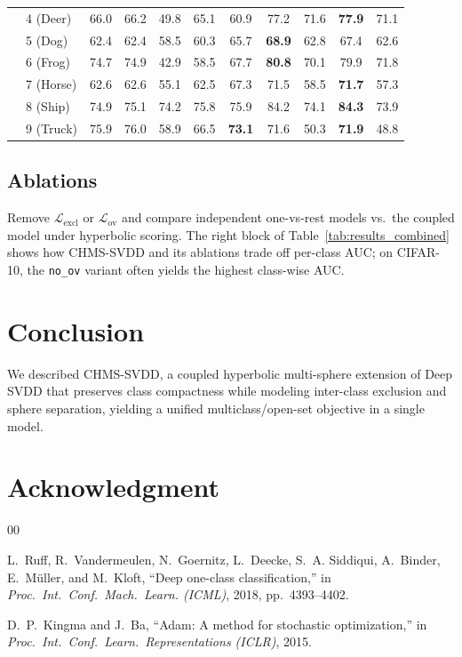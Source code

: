\documentclass[conference]{IEEEtran}
\begin{document}
\begin{table}[t]
{\begin{tabular}{@{}llccccc|cccc@{}}
& 4 (Deer) & 66.0 & 66.2 & 49.8 & 65.1 & 60.9 & 77.2 & 71.6 & \textbf{77.9} & 71.1 \\
& 5 (Dog) & 62.4 & 62.4 & 58.5 & 60.3 & 65.7 & \textbf{68.9} & 62.8 & 67.4 & 62.6 \\
& 6 (Frog) & 74.7 & 74.9 & 42.9 & 58.5 & 67.7 & \textbf{80.8} & 70.1 & 79.9 & 71.8 \\
& 7 (Horse) & 62.6 & 62.6 & 55.1 & 62.5 & 67.3 & 71.5 & 58.5 & \textbf{71.7} & 57.3 \\
& 8 (Ship) & 74.9 & 75.1 & 74.2 & 75.8 & 75.9 & 84.2 & 74.1 & \textbf{84.3} & 73.9 \\
& 9 (Truck) & 75.9 & 76.0 & 58.9 & 66.5 & \textbf{73.1} & 71.6 & 50.3 & \textbf{71.9} & 48.8 \\
\bottomrule
\end{tabular}%
}
\end{table}

\subsection{Ablations}
Remove $\mathcal{L}_{\text{excl}}$ or $\mathcal{L}_{\text{ov}}$ and compare independent one-vs-rest models vs.\ the coupled model under hyperbolic scoring. The right block of Table~\ref{tab:results_combined} shows how CHMS-SVDD and its ablations trade off per-class AUC; on CIFAR-10, the \texttt{no\_ov} variant often yields the highest class-wise AUC.

\section{Conclusion}
We described CHMS-SVDD, a coupled hyperbolic multi-sphere extension of Deep SVDD that preserves class compactness while modeling inter-class exclusion and sphere separation, yielding a unified multiclass/open-set objective in a single model.

\section*{Acknowledgment}



\begin{thebibliography}{00}

L.~Ruff, R.~Vandermeulen, N.~Goernitz, L.~Deecke, S.~A. Siddiqui, A.~Binder, E.~M\"uller, and M.~Kloft,
``Deep one-class classification,''
in \emph{Proc.\ Int.\ Conf.\ Mach.\ Learn. (ICML)}, 2018, pp.\ 4393--4402.

D.~P.~Kingma and J.~Ba,
``Adam: A method for stochastic optimization,''
in \emph{Proc.\ Int.\ Conf.\ Learn.\ Representations (ICLR)}, 2015.

\end{thebibliography}
\end{document}
